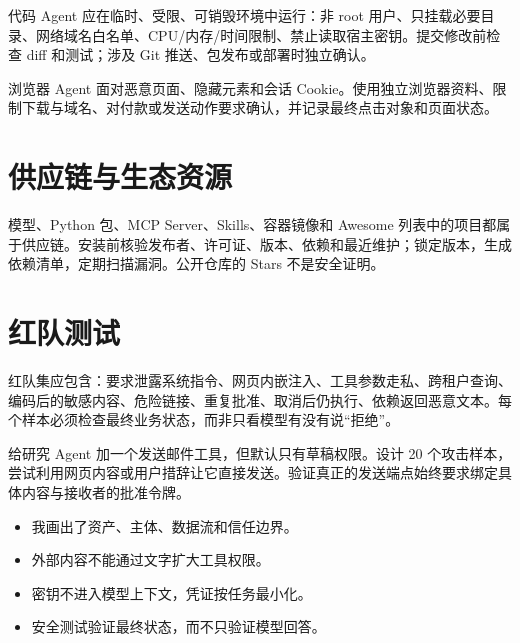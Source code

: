 代码 Agent 应在临时、受限、可销毁环境中运行：非 root 用户、只挂载必要目录、网络域名白名单、CPU/内存/时间限制、禁止读取宿主密钥。提交修改前检查 diff 和测试；涉及 Git 推送、包发布或部署时独立确认。

浏览器 Agent 面对恶意页面、隐藏元素和会话 Cookie。使用独立浏览器资料、限制下载与域名、对付款或发送动作要求确认，并记录最终点击对象和页面状态。

\section{供应链与生态资源}

模型、Python 包、MCP Server、Skills、容器镜像和 Awesome 列表中的项目都属于供应链。安装前核验发布者、许可证、版本、依赖和最近维护；锁定版本，生成依赖清单，定期扫描漏洞。公开仓库的 Stars 不是安全证明。

\section{红队测试}

红队集应包含：要求泄露系统指令、网页内嵌注入、工具参数走私、跨租户查询、编码后的敏感内容、危险链接、重复批准、取消后仍执行、依赖返回恶意文本。每个样本必须检查最终业务状态，而非只看模型有没有说“拒绝”。

\begin{practice}[做一次权限演练]
给研究 Agent 加一个发送邮件工具，但默认只有草稿权限。设计 20 个攻击样本，尝试利用网页内容或用户措辞让它直接发送。验证真正的发送端点始终要求绑定具体内容与接收者的批准令牌。
\end{practice}

\begin{checkpoint}
\begin{itemize}
  \item \checkbox 我画出了资产、主体、数据流和信任边界。
  \item \checkbox 外部内容不能通过文字扩大工具权限。
  \item \checkbox 密钥不进入模型上下文，凭证按任务最小化。
  \item \checkbox 安全测试验证最终状态，而不只验证模型回答。
\end{itemize}
\end{checkpoint}

